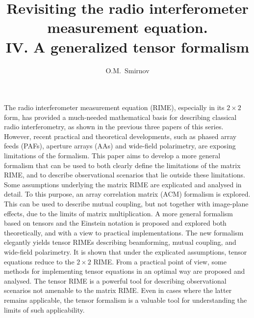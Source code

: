 \documentclass{aa}
\begin{document}
\title{Revisiting the radio interferometer measurement equation.\\IV. A generalized tensor formalism}

\author{O.M.\ Smirnov}


\date{}


\abstract%
{The radio interferometer measurement equation (RIME), especially in its $2\times2$ form, has provided a much-needed mathematical basis for describing classical radio interferometry, as shown in the previous three papers of this series. However, recent practical and theoretical developments, such as phased array feeds (PAFs), aperture arrays (AAs) and wide-field polarimetry, are exposing limitations of the formalism.
}
{This paper aims to develop a more general formalism that can be used to both clearly define the limitations of the matrix RIME, and
to describe observational scenarios that lie outside these limitations.
}
{Some assumptions underlying the matrix RIME are explicated and analysed in detail. To this purpose, an array correlation matrix (ACM) formalism is explored. This can be used to describe mutual coupling, but not together with image-plane effects, due to the limits of matrix multiplication. A more general formalism based on tensors and the Einstein notation is proposed and explored both theoretically, and with a view to practical implementations.
}%
{The new formalism elegantly yields tensor RIMEs describing beamforming, mutual coupling, and wide-field polarimetry. It is shown that under the explicated assumptions, tensor equations reduce to the $2\times2$ RIME. From a practical point of view, some methods for implementing tensor equations in an optimal way are proposed and analysed.
}%
{The tensor RIME is a powerful tool for describing observational scenarios not amenable to the matrix RIME. Even in cases where the latter 
remains applicable, the tensor formalism is a valuable tool for understanding the limits of such applicability.
}

\end{document}
